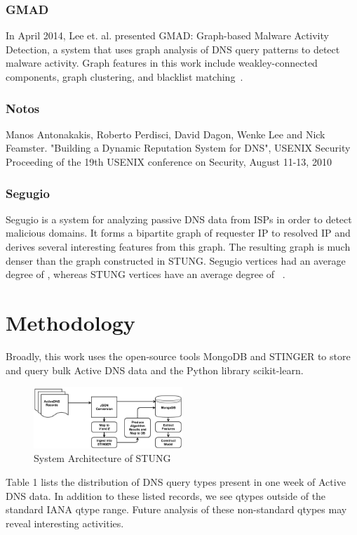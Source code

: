 \documentclass{acm_proc_article-sp}
\begin{document}
\subsubsection{GMAD}
In April 2014, Lee et. al. presented GMAD: Graph-based Malware Activity Detection, a system that uses graph analysis of DNS query patterns to detect malware activity. Graph features in this work include weakley-connected components, graph clustering, and blacklist matching~\cite{GMAD}.

\subsubsection{Notos}
Manos Antonakakis, Roberto Perdisci, David Dagon, Wenke Lee and Nick Feamster. "Building a Dynamic Reputation System for DNS", USENIX Security Proceeding of the 19th USENIX conference on Security, August 11-13, 2010

\subsubsection{Segugio}
Segugio is a system for analyzing passive DNS data from ISPs in order to detect malicious domains. It forms a bipartite graph of requester IP to resolved IP and derives several interesting features from this graph. The resulting graph is much denser than the graph constructed in STUNG. Segugio vertices had an average degree of , whereas STUNG vertices have an average degree of ~\cite{Segugio}.


\section{Methodology}
Broadly, this work uses the open-source tools MongoDB and STINGER to store and query bulk Active DNS data and the Python library scikit-learn.

\begin{figure}[h]
\includegraphics[width=0.5\textwidth]{images/stung_diagram_cropped.png}
\caption{System Architecture of STUNG}\label{fig:stung}
\end{figure}

Table 1 lists the distribution of DNS query types present in one week of Active DNS data. In addition to these listed records, we see qtypes outside of the standard IANA qtype range. Future analysis of these non-standard qtypes may reveal interesting activities.
\end{document}
